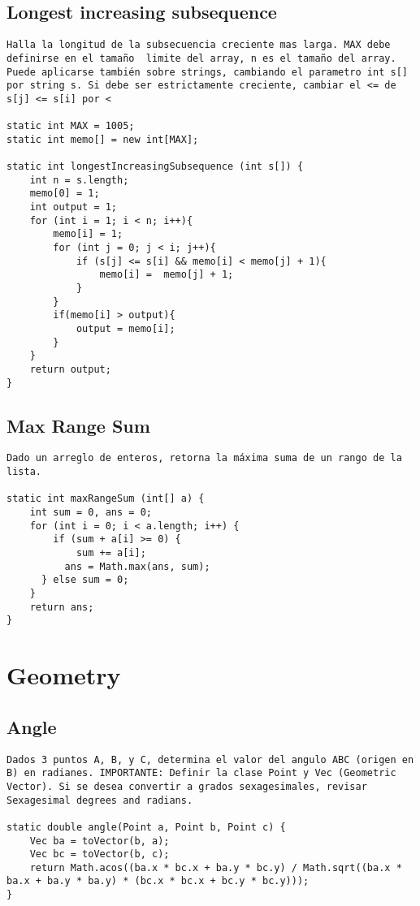 \documentclass[10pt,letterpaper,twocolumn,twosided]{article}
\begin{document}
\subsection{Longest increasing subsequence}
\begin{lstlisting}
Halla la longitud de la subsecuencia creciente mas larga. MAX debe definirse en el tamaño  limite del array, n es el tamaño del array. Puede aplicarse también sobre strings, cambiando el parametro int s[] por string s. Si debe ser estrictamente creciente, cambiar el <= de s[j] <= s[i] por <

static int MAX = 1005;
static int memo[] = new int[MAX];

static int longestIncreasingSubsequence (int s[]) {
	int n = s.length;
	memo[0] = 1;
	int output = 1;
	for (int i = 1; i < n; i++){
		memo[i] = 1;
		for (int j = 0; j < i; j++){
			if (s[j] <= s[i] && memo[i] < memo[j] + 1){
				memo[i] =  memo[j] + 1;
			} 
		}
		if(memo[i] > output){
			output = memo[i];
		}
	}
	return output;
}\end{lstlisting}

\subsection{Max Range Sum}
\begin{lstlisting}
Dado un arreglo de enteros, retorna la máxima suma de un rango de la lista.

static int maxRangeSum (int[] a) {
	int sum = 0, ans = 0;
	for (int i = 0; i < a.length; i++) {
		if (sum + a[i] >= 0) {  
			sum += a[i];
		  ans = Math.max(ans, sum);          
	  } else sum = 0;
	}
	return ans;
}
\end{lstlisting}

\section{Geometry}

\subsection{Angle}
\begin{lstlisting}
Dados 3 puntos A, B, y C, determina el valor del angulo ABC (origen en B) en radianes. IMPORTANTE: Definir la clase Point y Vec (Geometric Vector). Si se desea convertir a grados sexagesimales, revisar Sexagesimal degrees and radians.

static double angle(Point a, Point b, Point c) { 
  	Vec ba = toVector(b, a);
  	Vec bc = toVector(b, c);
  	return Math.acos((ba.x * bc.x + ba.y * bc.y) / Math.sqrt((ba.x * ba.x + ba.y * ba.y) * (bc.x * bc.x + bc.y * bc.y))); 
}
\end{lstlisting}
\end{document}
